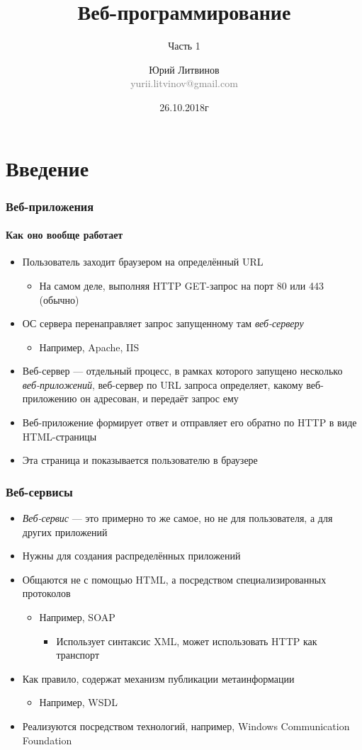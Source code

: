 \documentclass[xetex,mathserif,serif]{beamer}
\title{Веб-программирование}
\subtitle{Часть 1}
\author[Юрий Литвинов]{Юрий Литвинов\\\small{\textcolor{gray}{yurii.litvinov@gmail.com}}}
\date{26.10.2018г}
\begin{document}
	\frame{\titlepage}

	\section{Введение}

	\begin{frame}
		\frametitle{Веб-приложения}
		\framesubtitle{Как оно вообще работает}
		\begin{itemize}
			\item Пользователь заходит браузером на определённый URL
			\begin{itemize}
				\item На самом деле, выполняя HTTP GET-запрос на порт 80 или 443 (обычно)
			\end{itemize}
			\item ОС сервера перенаправляет запрос запущенному там \textit{веб-серверу}
			\begin{itemize}
				\item Например, Apache, IIS
			\end{itemize}
			\item Веб-сервер --- отдельный процесс, в рамках которого запущено несколько \textit{веб-приложений}, веб-сервер по URL запроса определяет, какому веб-приложению он адресован, и передаёт запрос ему
			\item Веб-приложение формирует ответ и отправляет его обратно по HTTP в виде HTML-страницы
			\item Эта страница и показывается пользователю в браузере
		\end{itemize}
	\end{frame}

	\begin{frame}
		\frametitle{Веб-сервисы}
		\begin{itemize}
			\item \textit{Веб-сервис} --- это примерно то же самое, но не для пользователя, а для других приложений
			\item Нужны для создания распределённых приложений
			\item Общаются не с помощью HTML, а посредством специализированных протоколов
			\begin{itemize}
				\item Например, SOAP 
				\begin{itemize}
					\item Использует синтаксис XML, может использовать HTTP как транспорт
				\end{itemize}
			\end{itemize}
			\item Как правило, содержат механизм публикации метаинформации
			\begin{itemize}
				\item Например, WSDL
			\end{itemize}
			\item Реализуются посредством технологий, например, Windows Communication Foundation
		\end{itemize}
	\end{frame}
\end{document}
